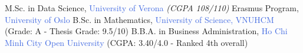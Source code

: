 %
%
%


\begin{scholarship}
					{M.Sc. in Data Science, \textcolor{RoyalBlue}{University of Verona} \textit{(CGPA 108/110)}}
					{Erasmus Program, \textcolor{RoyalBlue}{University of Oslo}}
					{B.Sc. in Mathematics, \textcolor{RoyalBlue}{University of Science, VNUHCM} (Grade: A - Thesis Grade: 9.5/10)}
					{B.B.A. in Business Administration, \textcolor{RoyalBlue}{Ho Chi Minh City Open University} (CGPA: 3.40/4.0 - Ranked 4th overall)}
\end{scholarship}